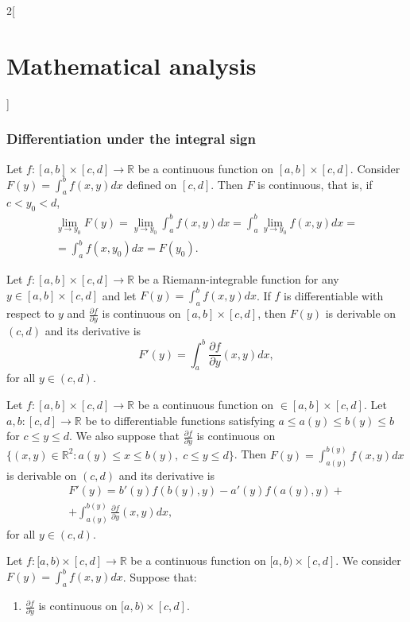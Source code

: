 \documentclass[class=article,crop=false]{standalone}
\begin{document}
\begin{multicols}{2}[\section{Mathematical analysis}]
\subsubsection{Differentiation under the integral sign}
\begin{theorem}
Let $f:[a,b]\times[c,d]\rightarrow\mathbb{R}$ be a continuous function on $[a,b]\times[c,d]$. Consider $\displaystyle F(y)=\int_a^bf(x,y)dx$ defined on $[c,d]$. Then $F$ is continuous, that is, if $c<y_0<d$, \begin{multline*}
    \lim_{y\to y_0}F(y)=\lim_{y\to y_0}\int_a^bf(x,y)dx=\int_a^b\lim_{y\to y_0}f(x,y)dx=\\=\int_a^bf(x,y_0)dx=F(y_0).
\end{multline*}
\end{theorem}
\begin{theorem}
Let $f:[a,b]\times[c,d]\rightarrow\mathbb{R}$ be a Riemann-integrable function for any $y\in[a,b]\times[c,d]$ and let $\displaystyle F(y)=\int_a^bf(x,y)dx$. If $f$ is differentiable with respect to $y$ and $\displaystyle\frac{\partial f}{\partial y}$ is continuous on $[a,b]\times[c,d]$, then $F(y)$ is derivable on $(c,d)$ and its derivative is $$F'(y)=\int_a^b\frac{\partial f}{\partial y}(x,y)dx,$$ for all $y\in(c,d)$.
\end{theorem}
\begin{theorem}
Let $f:[a,b]\times[c,d]\rightarrow\mathbb{R}$ be a continuous function on $\in[a,b]\times[c,d]$. Let $a,b:[c,d]\rightarrow\mathbb{R}$ be to differentiable functions satisfying $a\leq a(y)\leq b(y)\leq b$ for $c\leq y\leq d$. We also suppose that $\displaystyle\frac{\partial f}{\partial y}$ is continuous on $\{(x,y)\in\mathbb{R}^2:a(y)\leq x\leq b(y),\; c\leq y\leq d\}$. Then $\displaystyle F(y)=\int_{a(y)}^{b(y)}f(x,y)dx$ is derivable on $(c,d)$ and its derivative is \begin{multline*}
    F'(y)=b'(y)f(b(y),y)-a'(y)f(a(y),y)+\\+\int_{a(y)}^{b(y)}\frac{\partial f}{\partial y}(x,y)dx,
\end{multline*} for all $y\in(c,d)$.
\end{theorem}
\begin{theorem}
Let $f:[a,b)\times[c,d]\rightarrow\mathbb{R}$ be a continuous function on $[a,b)\times[c,d]$. We consider $\displaystyle F(y)=\int_a^bf(x,y)dx$. Suppose that: 
\begin{enumerate}
    \item $\displaystyle\frac{\partial f}{\partial y}$ is continuous on $[a,b)\times[c,d]$.

\end{enumerate}
\end{theorem}
\end{multicols}
\end{document}
